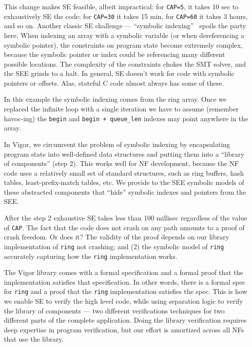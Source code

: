 \documentclass[letterpaper,twocolumn,10pt]{article}
\newcommand{\code}[1]{\lstinline{#1}}
\begin{document}
This change makes SE feasible, albeit impractical: for \code{CAP=5}, it takes 10
sec to exhaustively SE the code; for \code{CAP=30} it takes 15 min, for
\code{CAP=60} it takes 3 hours, and so on. Another classic SE challenge ---
``symbolic
indexing''~\cite{sen2005cute,godefroid2008automated,boonstoppel2008rwset} spoils
the party here. When
indexing an array with a symbolic variable (or when dereferencing a symbolic
pointer), the constraints on program state become extremely complex, because the
symbolic pointer or index could be referencing many different possible
locations. The complexity of the constraints chokes the SMT solver, and the SEE
grinds to a halt. In general, SE doesn't work for code with symbolic pointers or
offsets. Alas, stateful C code almost always has some of these.

In this example the symbolic indexing comes from the ring array. Once we
replaced the infinite loop with a single iteration we have to assume (remember
havoc-ing) the \code{begin} and \code{begin + queue_len} indexes may point
anywhere in the array.

In Vigor, we circumvent the problem of symbolic indexing by encapsulating program
state into well-defined data structures and putting them into a ``library of
components'' (step 2). This works well for NF development, because the NF code
uses a relatively small set of standard structures, such as ring buffers, hash
tables, least-prefix-match tables, etc. We provide to the SEE symbolic models of
these abstracted components that ``hide'' symbolic indexes and pointers from the
SEE.

After the step 2 exhaustive SE takes less than 100 millisec regardless of the
value of \code{CAP}. The fact that the code does not
crash on any path amounts to a proof of crash freedom. Or does it? The validity
of the proof depends on our library implementation of \code{ring} not
crashing; and (2) the symbolic model of \code{ring} accurately capturing how the
\code{ring} implementation works.

The Vigor library comes with a formal specification and a formal proof that the
implementation satisfies that specification. In other words, there is a formal
spec for \code{ring} and a proof that the \code{ring} implementation satisfies
the spec. This is how we enable SE to verify the high level code, while using
separation logic to verify the library of components --- two different
verifications techniques for two different parts of the complete application.
Doing the library verification requires deep expertise in program verification,
but our effort is amortized across all NFs that use the library.
\end{document}
